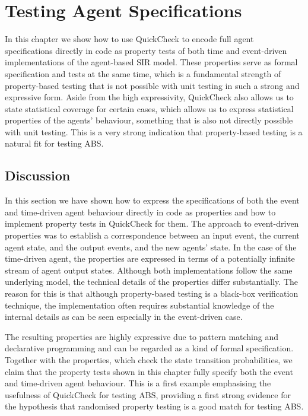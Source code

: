 \chapter{Testing Agent Specifications}
\label{ch:agentspec}

In this chapter we show how to use QuickCheck to encode full agent specifications directly in code as property tests of both time and event-driven implementations of the agent-based SIR model. These properties serve as formal specification and tests at the same time, which is a fundamental strength of property-based testing that is not possible with unit testing in such a strong and expressive form. Aside from the high expressivity, QuickCheck also allows us to state statistical coverage for certain cases, which allows us to express statistical properties of the agents' behaviour, something that is also not directly possible with unit testing. This is a very strong indication that property-based testing is a natural fit for testing ABS.





\section{Discussion}
In this section we have shown how to express the specifications of both the event and time-driven agent behaviour directly in code as properties and how to implement property tests in QuickCheck for them. The approach to event-driven properties was to establish a correspondence between an input event, the current agent state, and the output events, and the new agents' state. In the case of the time-driven agent, the properties are expressed in terms of a potentially infinite stream of agent output states. Although both implementations follow the same underlying model, the technical details of the properties differ substantially. The reason for this is that although property-based testing is a black-box verification technique, the implementation often requires substantial knowledge of the internal details as can be seen especially in the event-driven case.

The resulting properties are highly expressive due to pattern matching and declarative programming and can be regarded as a kind of formal specification. Together with the properties, which check the state transition probabilities, we claim that the property tests shown in this chapter fully specify both the event and time-driven agent behaviour. This is a first example emphasising the usefulness of QuickCheck for testing ABS, providing a first strong evidence for the hypothesis that randomised property testing is a good match for testing ABS.

